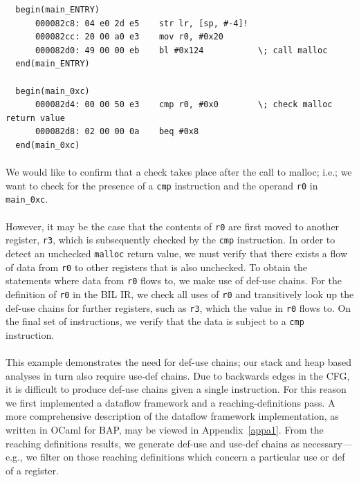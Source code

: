 \documentclass[letterpaper,11pt]{article}
\begin{document}
\begin{center}
\lstset{language=C, label=mallocdisasm,
caption=Malloc disassembly, breaklines=true, basicstyle=\tiny, numbers=none}
\begin{lstlisting}
  begin(main_ENTRY)
      000082c8: 04 e0 2d e5    str lr, [sp, #-4]!
      000082cc: 20 00 a0 e3    mov r0, #0x20
      000082d0: 49 00 00 eb    bl #0x124           \; call malloc
  end(main_ENTRY)

  begin(main_0xc)
      000082d4: 00 00 50 e3    cmp r0, #0x0        \; check malloc return value
      000082d8: 02 00 00 0a    beq #0x8
  end(main_0xc)
\end{lstlisting}
\label{fig:malloc}
\end{center}

\paragraph{}
We would like to confirm that a check takes place after the call to malloc;
i.e.; we want to check for the presence of a \texttt{cmp} instruction and the
operand \texttt{r0} in \texttt{main\_0xc}.

\paragraph{}
However, it may be the case that the contents of \texttt{r0} are first
moved to another register, \texttt{r3}, which is subsequently checked by the
\texttt{cmp} instruction. In order to detect an unchecked \texttt{malloc}
return value, we must verify that there exists a flow of data from
\texttt{r0} to other registers that is also unchecked. To obtain the statements
where data from \texttt{r0} flows to, we make use of def-use chains. For the
definition of \texttt{r0} in the BIL IR, we check all uses of \texttt{r0} and
transitively look up the def-use chains for further registers, such as
\texttt{r3}, which the value in \texttt{r0} flows to. On the final set of
instructions, we verify that the data is subject to a \texttt{cmp} instruction.

\paragraph{}
This example demonstrates the need for def-use chains; our stack and heap based
analyses in turn also require use-def chains. Due to backwards edges in the
CFG, it is difficult to produce def-use chains given a single instruction. For
this reason we first implemented a dataflow framework and a
reaching-definitions pass. A more comprehensive description of the
dataflow framework implementation, as written in OCaml for
BAP, may be viewed in Appendix~\ref{appa1}.
From the reaching definitions results, we generate def-use
and use-def chains as necessary---e.g., we filter on those reaching definitions
which concern a particular use or def of a register.
\end{document}
